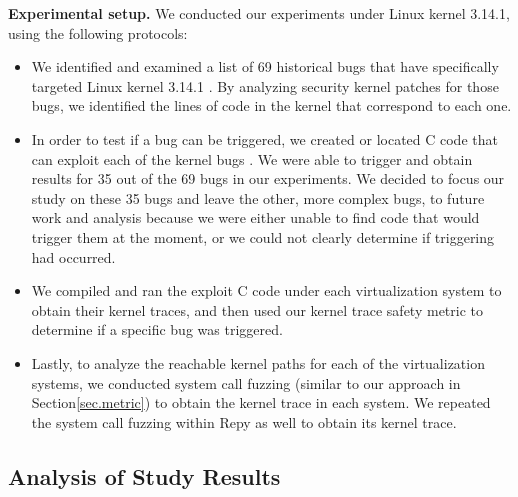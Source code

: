 \textbf{Experimental setup.}
We conducted our experiments under Linux kernel 3.14.1, using the following
protocols:

\begin{itemize}
\item We identified and examined a list of  69 historical bugs that have
specifically
targeted Linux kernel 3.14.1 \cite{CVE-Datasource}. By analyzing
security kernel patches for those bugs,
we identified the lines of code in the kernel that correspond to each
one.

\item In order to test if a bug can be triggered, we created or located C
code that can exploit each of the kernel bugs \cite{Exploit-Database}.
We were able to trigger and obtain results for
35 out of the 69 bugs in our experiments. We decided to focus our study on these
35 bugs and leave the other, more complex bugs, to future work and analysis
because we were either unable to find code that would trigger them at the moment,
or we could not clearly determine if triggering had occurred. 

\item We compiled and ran the exploit C code under each virtualization
system to
obtain their kernel traces, and then used our kernel trace safety metric to
determine
if a specific bug was triggered.

\item Lastly, to analyze the reachable kernel paths for each of the
virtualization systems,
we conducted system call fuzzing (similar to our approach in Section\ref{sec.metric}) to obtain
the kernel trace in each system.
We repeated the system call fuzzing within Repy as well to obtain its
kernel trace.
\end{itemize}

\subsection{Analysis of Study Results}


